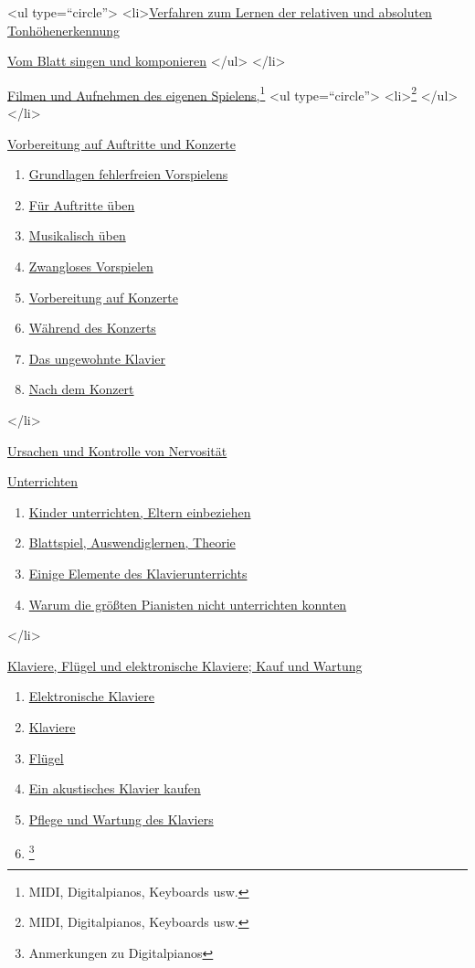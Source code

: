    <ul type=\enquote{circle}>
    <li>\hyperref[c1iii12tonhoehe]{Verfahren zum Lernen der relativen und absoluten Tonhöhenerkennung}
    \item \hyperref[c1iii12blatt]{Vom Blatt singen und komponieren}
   </ul>
 </li>
 \item \hyperref[c1iii13]{Filmen und Aufnehmen des eigenen Spielens,\footnote{MIDI, Digitalpianos, Keyboards usw.}}
     <ul type=\enquote{circle}>
      <li>\hyperref[c1iii13MIDI]{\footnote{MIDI, Digitalpianos, Keyboards usw.}}
    </ul>
 </li>
 \item \hyperref[c1iii14]{Vorbereitung auf Auftritte und Konzerte}
  \begin{enumerate}[label={\alph*.}] 
   <li>\hyperref[c1iii14a]{Nutzen und Risiken von Auftritten und Konzerten}
   \item \hyperref[c1iii14b]{Grundlagen fehlerfreien Vorspielens}
   \item \hyperref[c1iii14c]{Für Auftritte üben}
   \item \hyperref[c1iii14d]{Musikalisch üben}
   \item \hyperref[c1iii14e]{Zwangloses Vorspielen}
   \item \hyperref[c1iii14f]{Vorbereitung auf Konzerte}
   \item \hyperref[c1iii14g]{Während des Konzerts}
   \item \hyperref[c1iii14h]{Das ungewohnte Klavier}
   \item \hyperref[c1iii14i]{Nach dem Konzert}
   \end{enumerate}
 </li>
 \item \hyperref[c1iii15]{Ursachen und Kontrolle von Nervosität}
 \item \hyperref[c1iii16]{Unterrichten}
  \begin{enumerate}[label={\alph*.}] 
   <li>\hyperref[c1iii16a]{Lehrer}
   \item \hyperref[c1iii16b]{Kinder unterrichten, Eltern einbeziehen}
   \item \hyperref[c1iii16c]{Blattspiel, Auswendiglernen, Theorie}
   \item \hyperref[c1iii16d]{Einige Elemente des Klavierunterrichts}
   \item \hyperref[c1iii16e]{Warum die größten Pianisten nicht unterrichten konnten}
   \end{enumerate}
 </li>
 \item \hyperref[c1iii17]{Klaviere, Flügel und elektronische Klaviere; Kauf und Wartung}
  \begin{enumerate}[label={\alph*.}] 
   <li>\hyperref[c1iii17a]{Flügel, akustisches oder elektronisches Klavier?}
   \item \hyperref[c1iii17b]{Elektronische Klaviere}
   \item \hyperref[c1iii17c]{Klaviere}
   \item \hyperref[c1iii17d]{Flügel}
   \item \hyperref[c1iii17e]{Ein akustisches Klavier kaufen}
   \item \hyperref[c1iii17f]{Pflege und Wartung des Klaviers}
   \item \hyperref[c1iii17g]{\footnote{Anmerkungen zu Digitalpianos}}
   \end{enumerate}
